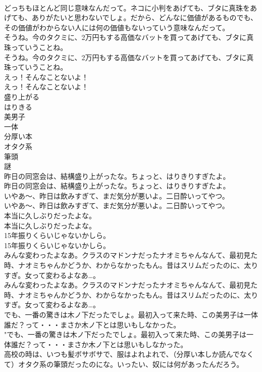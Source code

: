 \documentclass[8pt]{extreport}
\begin{document}
\begin{CJK}{UTF8}{min}
\\	どっちもほとんど同じ意味なんだって。ネコに小判をあげても、ブタに真珠をあげても、ありがたいと思わないでしょ。だから、どんなに価値があるものでも、その価値がわからない人には何の価値もないっていう意味なんだって。 
\\	そうね。今のタクミに、2万円もする高価なバットを買ってあげても、ブタに真珠っていうことね。	
\\	そうね。今のタクミに、2万円もする高価なバットを買ってあげても、ブタに真珠っていうことね。 
\\	えっ！そんなことないよ！	
\\	えっ！そんなことないよ！ 
\\	盛り上がる
\\	はりきる
\\	美男子
\\	一体
\\	分厚い本
\\	オタク系
\\	筆頭
\\	謎
\\	昨日の同窓会は、結構盛り上がったな。ちょっと、はりきりすぎたよ。	
\\	昨日の同窓会は、結構盛り上がったな。ちょっと、はりきりすぎたよ。 
\\	いやあ〜、昨日は飲みすぎて、まだ気分が悪いよ。二日酔いってやつ。	
\\	いやあ〜、昨日は飲みすぎて、まだ気分が悪いよ。二日酔いってやつ。 
\\	本当に久しぶりだったよな。	
\\	本当に久しぶりだったよな。 
\\	15年振りくらいじゃないかしら。	
\\	15年振りくらいじゃないかしら。 
\\	みんな変わったよなあ。クラスのマドンナだったナオミちゃんなんて、最初見た時、ナオミちゃんかどうか、わからなかったもん。昔はスリムだったのに、太りすぎ。女って変わるよなあ…。	
\\	みんな変わったよなあ。クラスのマドンナだったナオミちゃんなんて、最初見た時、ナオミちゃんかどうか、わからなかったもん。昔はスリムだったのに、太りすぎ。女って変わるよなあ…。 
\\	でも、一番の驚きは木ノ下だったでしょ。最初入って来た時、この美男子は一体誰だ？って・・・まさか木ノ下とは思いもしなかった。	
\\	"でも、一番の驚きは木ノ下だったでしょ。最初入って来た時、この美男子は一体誰だ？って・・・まさか木ノ下とは思いもしなかった。 
\\	高校の時は、いつも髪ボサボサで、服はよれよれで、（分厚い本しか読んでなくて）オタク系の筆頭だったのにな。いったい、奴には何があったんだろう。	

\end{CJK}
\end{document}
